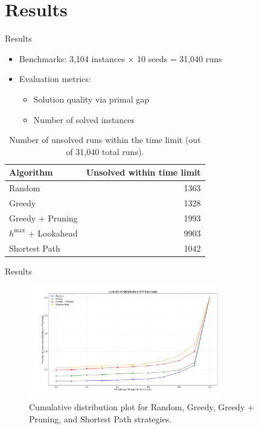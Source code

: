 \documentclass[aspectratio=169,xcolor=dvipsnames]{beamer}
\begin{document}
\section{Results}

\begin{frame}{Results}
	\begin{itemize}
		\item Benchmarks: 3,104 instances $\times$ 10 seeds = 31,040 runs
		\item Evaluation metrics:
		      \begin{itemize}
			      \item Solution quality via primal gap
			      \item Number of solved instances
		      \end{itemize}
	\end{itemize}

	\begin{table}[ht]
		\centering
		\begin{tabular}{|l|r|}
			\hline
			\textbf{Algorithm}     & \textbf{Unsolved within time limit} \\
			\hline
			Random                 & 1363                                \\
			Greedy                 & 1328                                \\
			Greedy + Pruning       & 1993                                \\
			$h^{\max}$ + Lookahead & 9903                                \\
			Shortest Path          & 1042                                \\
			\hline
		\end{tabular}
		\caption{Number of unsolved runs within the time limit (out of 31,040 total runs).}
		\label{tab:timelimit}
	\end{table}
\end{frame}


\begin{frame}{Results}
	\begin{figure}[ht]
		\centering
		\includegraphics[width=0.75\textwidth]{../thesis/images/algs0124.png}
		\caption{Cumulative distribution plot for Random, Greedy, Greedy + Pruning, and Shortest Path strategies.}
		\label{fig:rgps}
	\end{figure}
\end{frame}
\end{document}
